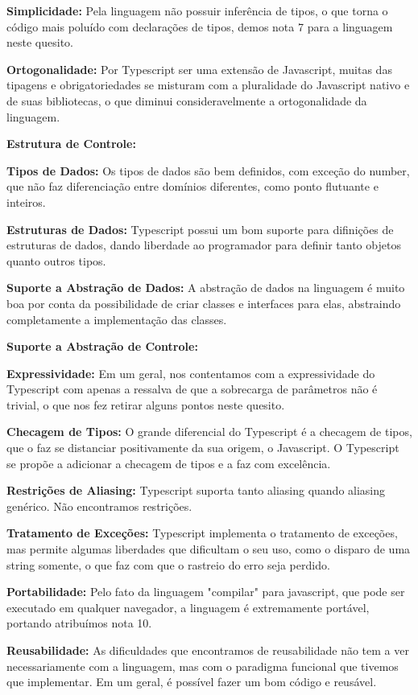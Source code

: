 \documentclass[rel_mlp]{iiufrgs}
\numberwithin{figure}{chapter}
\begin{document}
\textbf{Simplicidade:} Pela linguagem não possuir inferência de tipos, o que torna o código mais poluído com declarações de tipos, demos nota 7 para a linguagem neste quesito.

\textbf{Ortogonalidade:} Por Typescript ser uma extensão de Javascript, muitas das tipagens e obrigatoriedades se misturam com a pluralidade do Javascript nativo e de suas bibliotecas, o que diminui consideravelmente a ortogonalidade da linguagem.

\textbf{Estrutura de Controle:}

\textbf{Tipos de Dados:} Os tipos de dados são bem definidos, com exceção do number, que não faz diferenciação entre domínios diferentes, como ponto flutuante e inteiros.

\textbf{Estruturas de Dados:} Typescript possui um bom suporte para difinições de estruturas de dados, dando liberdade ao programador para definir tanto objetos quanto outros tipos. 

\textbf{Suporte a Abstração de Dados:} A abstração de dados na linguagem é muito boa por conta da possibilidade de criar classes e interfaces para elas, abstraindo completamente a implementação das classes.

\textbf{Suporte a Abstração de Controle:}

\textbf{Expressividade:} Em um geral, nos contentamos com a expressividade do Typescript com apenas a ressalva de que a sobrecarga de parâmetros não é trivial, o que nos fez retirar alguns pontos neste quesito.

\textbf{Checagem de Tipos:} O grande diferencial do Typescript é a checagem de tipos, que o faz se distanciar positivamente da sua origem, o Javascript. O Typescript se propõe a adicionar a checagem de tipos e a faz com excelência.

\textbf{Restrições de Aliasing:} Typescript suporta tanto aliasing quando aliasing genérico. Não encontramos restrições.

\textbf{Tratamento de Exceções:} Typescript implementa o tratamento de exceções, mas permite algumas liberdades que dificultam o seu uso, como o disparo de uma string somente, o que faz com que o rastreio do erro seja perdido.

\textbf{Portabilidade:} Pelo fato da linguagem "compilar" para javascript, que pode ser executado em qualquer navegador, a linguagem é extremamente portável, portando atribuímos nota 10.

\textbf{Reusabilidade:} As dificuldades que encontramos de reusabilidade não tem a ver necessariamente com a linguagem, mas com o paradigma funcional que tivemos que implementar. Em um geral, é possível fazer um bom código e reusável.
\end{document}

